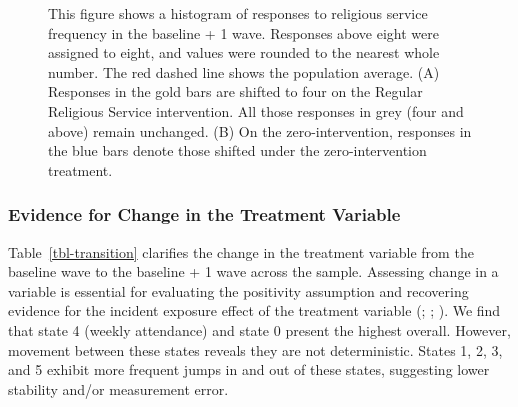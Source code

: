 \documentclass[
  single column]{article}
\begin{document}
\begin{figure}


\caption{\label{fig-hist}This figure shows a histogram of responses to
religious service frequency in the baseline + 1 wave. Responses above
eight were assigned to eight, and values were rounded to the nearest
whole number. The red dashed line shows the population average. (A)
Responses in the gold bars are shifted to four on the Regular Religious
Service intervention. All those responses in grey (four and above)
remain unchanged. (B) On the zero-intervention, responses in the blue
bars denote those shifted under the zero-intervention treatment.}

\end{figure}%

\newpage{}

\subsubsection{Evidence for Change in the Treatment
Variable}\label{evidence-for-change-in-the-treatment-variable}

Table~\ref{tbl-transition} clarifies the change in the treatment
variable from the baseline wave to the baseline + 1 wave across the
sample. Assessing change in a variable is essential for evaluating the
positivity assumption and recovering evidence for the incident exposure
effect of the treatment variable (; ; ).
We find that state 4 (weekly attendance) and state 0 present the highest
overall. However, movement between these states reveals they are not
deterministic. States 1, 2, 3, and 5 exhibit more frequent jumps in and
out of these states, suggesting lower stability and/or measurement
error.
\end{document}
